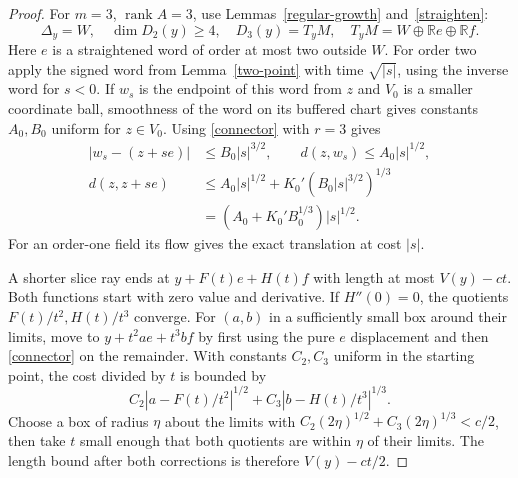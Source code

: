 \documentclass[11pt,letterpaper]{article}
\newcommand{\R}{\mathbb R}
\newcommand{\rank}{\operatorname{rank}}
\begin{document}
\begin{proof}
For $m=3$, $\rank A=3$, use Lemmas~\ref{regular-growth} and~\ref{straighten}:
\[
 \Delta_y=W,\quad \dim D_2(y)\ge4,\quad D_3(y)=T_yM,\quad
 T_yM=W\oplus\R e\oplus\R f .
\]
Here $e$ is a straightened word of order at most two outside $W$.
For order two apply the signed word from Lemma~\ref{two-point} with
time $\sqrt{|s|}$, using the inverse word for $s<0$.
If $w_s$ is the endpoint of this word from $z$ and $V_0$ is a
smaller coordinate ball, smoothness of the word on its buffered chart
gives constants $A_0,B_0$ uniform for $z\in V_0$. Using
\eqref{connector} with $r=3$ gives
\[
 \begin{aligned}
 |w_s-(z+se)|&\le B_0|s|^{3/2},\qquad d(z,w_s)\le A_0|s|^{1/2},\\
 d(z,z+se)&\le A_0|s|^{1/2}+K_0'(B_0|s|^{3/2})^{1/3}\\
           &=(A_0+K_0'B_0^{1/3})|s|^{1/2}.
 \end{aligned}
\]
For an order-one
field its flow gives the exact translation at cost $|s|$.

A shorter slice ray ends at $y+F(t)e+H(t)f$ with length at most $V(y)-ct$.
Both functions start with zero value and derivative. If $H''(0)=0$, the
quotients $F(t)/t^2,H(t)/t^3$ converge. For $(a,b)$ in a sufficiently
small box around their limits, move to $y+t^2ae+t^3bf$ by first using
the pure $e$ displacement and then \eqref{connector} on the remainder.
With constants $C_2,C_3$ uniform in the starting point, the cost divided
by $t$ is bounded by
\[
 C_2|a-F(t)/t^2|^{1/2}+C_3|b-H(t)/t^3|^{1/3}.
\]
Choose a box of radius $\eta$ about the limits with
$C_2(2\eta)^{1/2}+C_3(2\eta)^{1/3}<c/2$, then take $t$ small enough
that both quotients are within $\eta$ of their limits.
The length bound after both corrections is therefore $V(y)-ct/2$.


\end{proof}
\end{document}
